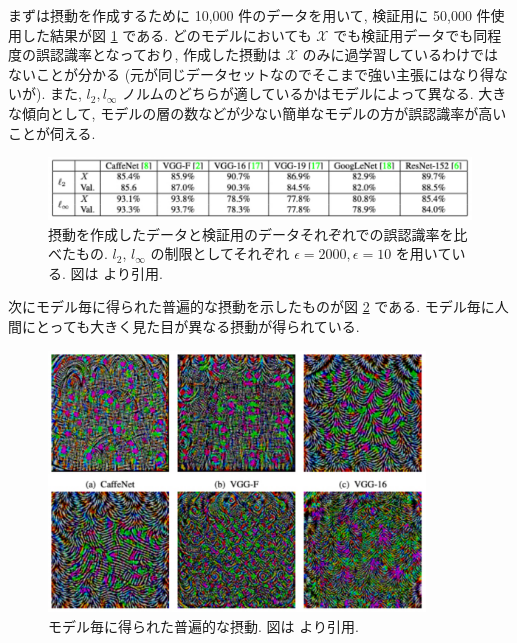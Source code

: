 まずは摂動を作成するために 10,000 件のデータを用いて, 検証用に 50,000 件使用した結果が図 \ref{fig:universal-adversarial-result-table} である.
どのモデルにおいても $\mathcal{X}$ でも検証用データでも同程度の誤認識率となっており, 作成した摂動は $\mathcal{X}$ のみに過学習しているわけではないことが分かる (元が同じデータセットなのでそこまで強い主張にはなり得ないが).
また, $l_2, l_\infty$ ノルムのどちらが適しているかはモデルによって異なる.
大きな傾向として, モデルの層の数などが少ない簡単なモデルの方が誤認識率が高いことが伺える.
%
\begin{figure}[htbp]
\begin{center}
\includegraphics[width=14.0cm]{figures/universal-adversarial-result-table.pdf}
\end{center}
\caption{
摂動を作成したデータと検証用のデータそれぞれでの誤認識率を比べたもの.
$l_2$, $l_{\infty}$ の制限としてそれぞれ $\epsilon = 2000, \epsilon = 10$ を用いている.
図は \cite{moosavi2017universal} より引用.
}
\label{fig:universal-adversarial-result-table}
\end{figure}
%

次にモデル毎に得られた普遍的な摂動を示したものが図 \ref{fig:universal-adversarial-perturbations-models} である.
モデル毎に人間にとっても大きく見た目が異なる摂動が得られている.
%
\begin{figure}[htbp]
\begin{center}
\includegraphics[width=10.0cm]{figures/universal-adversarial-perturbations-models.pdf}
\end{center}
\caption{
モデル毎に得られた普遍的な摂動.
図は \cite{moosavi2017universal} より引用.
}
\label{fig:universal-adversarial-perturbations-models}
\end{figure}
%

